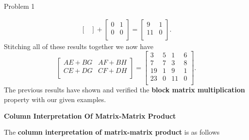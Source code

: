 \begin{problem}{Problem 1}
\begin{highlight}[Solution]
\begin{align*}
\begin{bmatrix}
            \end{bmatrix}
            + 
            \begin{bmatrix}
                0 & 1 \\
                0 & 0 \\
            \end{bmatrix}
            =
            \begin{bmatrix}
                9 & 1 \\
                11 & 0 \\
            \end{bmatrix}.
        \end{align*}
        Stitching all of these results together we now have 
        \begin{equation*}
            \begin{bmatrix}
                AE + BG & AF + BH \\
                CE + DG & CF + DH \\
            \end{bmatrix}
            = 
            \begin{bmatrix}
                3 & 5 & 1 & 6 \\
                7 & 7 & 3 & 8 \\
                19 & 1 & 9 & 1 \\
                23 & 0 & 11 & 0 \\
            \end{bmatrix}.
        \end{equation*}
        The previous results have shown and verified the \textbf{block matrix multiplication} property with our given examples. \vspace*{1em}

        \noindent \textbf{Column Interpretation Of Matrix-Matrix Product} \vspace*{1em}

        The \textbf{column interpretation of matrix-matrix product} is as follows


\end{highlight}
\end{problem}
